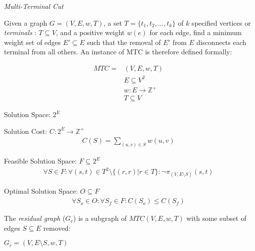 \begin{definition}
{\em Multi-Terminal Cut}

Given a graph $G=(V,E,w,T)$, a set $T=\{t_1, t_2, ..., t_k\}$ of $k$ specified vertices or {\em terminals} : $T \subseteq V$, and a positive weight $w(e)$ for each edge, find a minimum weight set of edges $E' \subseteq E$ such that the removal of $E'$ from $E$ disconnects each terminal from all others.
An instance of MTC is therefore defined formally:

\begin{align}
	\nonumber MTC = & (V,E,w,T)\\
	\nonumber & E \subseteq V^2\\
	\nonumber & w : E \rightarrow \mathbb{Z}^+\\
	\nonumber & T \subseteq V
\end{align}

Solution Space: $2^E$

Solution Cost: $C : 2^E \rightarrow \mathbb{Z}^+$
\begin{align}
	\nonumber C(S) = \displaystyle\sum\limits_{(u,v) \in S} w(u,v)
\end{align}

Feasible Solution Space: $F \subseteq 2^E$
\begin{align}
	\nonumber \forall S \in F : \forall (s, t) \in T^2 \setminus \{(r, r) | r \in T\} : \neg\pi_{(V, E \setminus S)}(s, t)
\end{align}

Optimal Solution Space: $O \subseteq F$
\begin{align}
	\forall S_o \in O : \forall S_f \in F : \nonumber C(S_o) \leq C(S_f)
\end{align}

\end{definition}

\begin{definition}
The {\em residual graph} ($G_r$) is a subgraph of $MTC(V,E,w,T)$ with some subset of edges $S \subseteq E$ removed:

$G_r = (V, E \setminus S, w, T)$
\end{definition}

